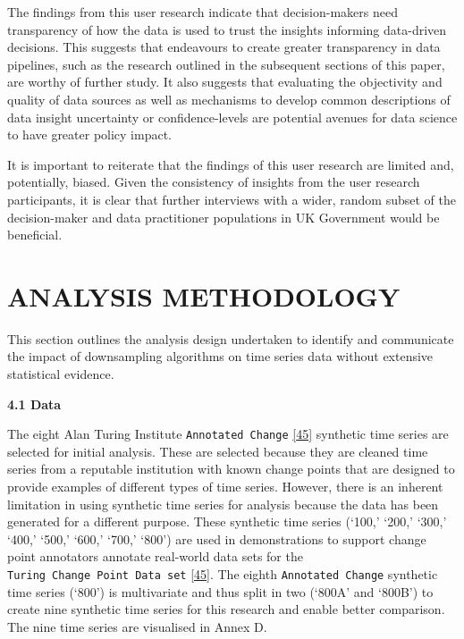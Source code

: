 \documentclass{article}
\begin{document}
The findings from this user research indicate that decision-makers need
transparency of how the data is used to trust the insights informing
data-driven decisions. This suggests that endeavours to create greater
transparency in data pipelines, such as the research outlined in the
subsequent sections of this paper, are worthy of further study. It also
suggests that evaluating the objectivity and quality of data sources as
well as mechanisms to develop common descriptions of data insight
uncertainty or confidence-levels are potential avenues for data science
to have greater policy impact.

It is important to reiterate that the findings of this user research are
limited and, potentially, biased. Given the consistency of insights from
the user research participants, it is clear that further interviews with
a wider, random subset of the decision-maker and data practitioner
populations in UK Government would be beneficial.

\hypertarget{analysis-methodology}{%
\section{ANALYSIS METHODOLOGY}\label{analysis-methodology}}

This section outlines the analysis design undertaken to identify and
communicate the impact of downsampling algorithms on time series data
without extensive statistical evidence.

\textbf{4.1 Data}

The eight Alan Turing Institute \texttt{Annotated\ Change}
\protect\hyperlink{ref-ATIChangePoint}{{[}45{]}} synthetic time series
are selected for initial analysis. These are selected because they are
cleaned time series from a reputable institution with known change
points that are designed to provide examples of different types of time
series. However, there is an inherent limitation in using synthetic time
series for analysis because the data has been generated for a different
purpose. These synthetic time series (`100,' `200,' `300,' `400,' `500,'
`600,' `700,' `800') are used in demonstrations to support change point
annotators annotate real-world data sets for the
\texttt{Turing\ Change\ Point\ Data\ set}
\protect\hyperlink{ref-ATIChangePoint}{{[}45{]}}. The eighth
\texttt{Annotated\ Change} synthetic time series (`800') is multivariate
and thus split in two (`800A' and `800B') to create nine synthetic time
series for this research and enable better comparison. The nine time
series are visualised in Annex D.
\end{document}
